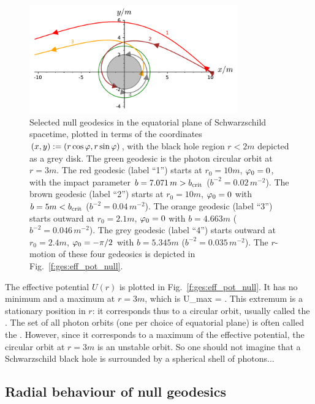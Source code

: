 \begin{figure}
\centerline{\includegraphics[width=0.8\textwidth]{ges_null_geod.pdf}}
\caption[]{\label{f:ges:null_geod} \footnotesize
Selected null geodesics in the equatorial plane of Schwarzschild spacetime,
plotted in terms
of the coordinates $(x,y) := (r\cos\varphi, r\sin\varphi)$, with the black hole
region $r<2m$ depicted as a grey disk.
The green geodesic is the photon circular orbit at $r=3m$.
The red geodesic (label ``1'') starts at $r_0=10 m$, $\varphi_0=0$, with
the impact parameter $b = 7.071 \, m > b_{\rm crit}$ ($b^{-2} = 0.02\, m^{-2}$).
The brown geodesic (label ``2'') starts at $r_0=10 m$, $\varphi_0=0$ with $b = 5 m < b_{\rm crit}$ ($b^{-2} = 0.04\, m^{-2}$).
The orange geodesic (label ``3'') starts outward at $r_0=2.1 m$, $\varphi_0=0$ with $b = 4.663 m$ ($b^{-2} = 0.046\, m^{-2}$).
The grey geodesic (label ``4'') starts outward at $r_0=2.4 m$, $\varphi_0=-\pi/2$ with $b = 5.345 m$ ($b^{-2} = 0.035\, m^{-2}$).
The $r$-motion of these four gedeosics is depicted in
Fig.~\ref{f:ges:eff_pot_null}.}
\end{figure}

The effective potential $U(r)$ is plotted in Fig.~\ref{f:ges:eff_pot_null}.
It has no minimum and a maximum at $r=3m$, which is
\be \label{e:ges:U_max}
    U_{\rm max} =  .
\ee
This extremum is a stationary position in $r$: it corresponds thus to a circular
orbit, usually called the .
The set of all photon orbits (one per choice of equatorial plane) is often
called the .
However, since it corresponds to a maximum of the effective potential, the circular
orbit at $r=3m$ is an unstable orbit. So one should not imagine that a
Schwarzschild black hole is surrounded by a spherical shell of photons...


\subsection{Radial behaviour of null geodesics}

